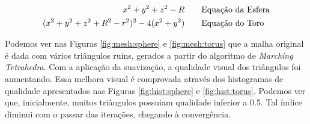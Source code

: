 \documentclass[11pt]{article}
\begin{document}
		\begin{eqnarray}
			x^2 + y^2 + z^2 -R &\text{\qquad Equação da Esfera} \label{eq:sphere}\\
			(x^2 + y^2 +z^2 + R^2 - r^2)^2 - 4(x^2 + y^2) &\text{\qquad Equação do Toro} \label{eq:torus}
		\end{eqnarray}

		Podemos ver nas Figuras \ref{fig:mesh:sphere} e \ref{fig:mesh:torus} que a malha original é dada com vários triângulos ruins, gerados a partir do algoritmo de \emph{Marching Tetrahedra}. Com a aplicação da suavização, a qualidade visual dos triângulos foi aumentando. Essa melhora visual é comprovada através dos histogramas de qualidade apresentados nas Figuras \ref{fig:hist:sphere} e \ref{fig:hist:torus}. Podemos ver que, inicialmente, muitos triângulos possuiam qualidade inferior a 0.5. Tal índice diminui com o passar das iterações, chegando à convergência.
\end{document}
